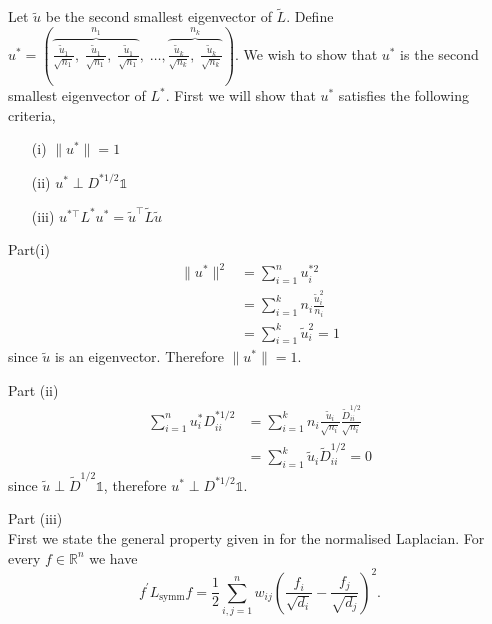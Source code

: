  Let $\tilde{u}$ be the second smallest eigenvector of $\tilde{L}$.  Define $u^* =  \left( \overbrace{\frac{\tilde{u}_1}{\sqrt{n_1}}, \; \frac{\tilde{u}_1}{\sqrt{n_1}}, \; \frac{\tilde{u}_1}{\sqrt{n_1}}}^{n_1}, \; \hdots, \overbrace{\frac{\tilde{u}_k}{\sqrt{n_k}}, \; \frac{\tilde{u}_k}{\sqrt{n_k}}}^{n_k} \right)$.  We wish to show that $u^*$ is the second smallest eigenvector of $L^*$.  First we will show that $u^*$ satisfies the following criteria, 

\begin{itemize}
\setlength\itemsep{0.5em}
\item[(i)] $ \|u^*\| = 1 $
\item[(ii)] $u^* \perp D^{* 1/2} \mathds{1}$
\item[(iii)] $u^{*\top} L^* u^* = \tilde{u}^{\top} \tilde{L} \tilde{u}$
\end{itemize}

Part(i)\\
\begin{align*}
 \|u^*\|^2 &= \sum_{i=1}^{n}u^{* 2}_i \\
&= \sum_{i = 1}^{k}n_i \frac{\tilde{u}_i^2}{n_i} \\
&= \sum_{i=1}^{k}\tilde{u}_i^2 = 1 
\end{align*}
since $\tilde{u}$ is an eigenvector. Therefore $\|u^*\| = 1$. 
 

Part (ii) \\
\begin{align*}
 \sum_{i=1}^nu^*_i D_{ii}^{* 1/2} &= \sum_{i=1}^k n_i \frac{\tilde{u}_i}{\sqrt{n_i}} \frac{\tilde{D}^{1/2}_{ii}}{\sqrt{n_i}} \\
&= \sum_{i=1}^k \tilde{u}_i \tilde{D}^{1/2}_{ii} = 0
\end{align*}
since $\tilde{u} \perp \tilde{D}^{1/2} \mathds{1}$, therefore $u^* \perp D^{* 1/2} \mathds{1}.$ 

Part (iii) \\
First we state the general property given in \cite{Luxburg2008} for the normalised Laplacian. For every $f \in  \mathbb{R}^n$ we have
\begin{equation}
  \label{eq:luxburg_vectors}
  f^{\prime} L_{\text{symm}}f = \frac{1}{2} \sum_{i,j=1}^n w_{ij} \left( \frac{f_i}{\sqrt{d_i}} - \frac{f_j}{\sqrt{d_j}}  \right)^2.
\end{equation}

